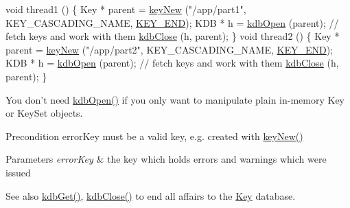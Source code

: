 \begin{DoxyCodeInclude}
\textcolor{keywordtype}{void} thread1 ()
\{
        Key * parent = \hyperlink{group__key_gad23c65b44bf48d773759e1f9a4d43b89}{keyNew} (\textcolor{stringliteral}{"/app/part1"}, KEY\_CASCADING\_NAME, \hyperlink{group__key_gga91fb3178848bd682000958089abbaf40aa8adb6fcb92dec58fb19410eacfdd403}{KEY\_END});
        KDB * h = \hyperlink{group__kdb_ga6808defe5870f328dd17910aacbdc6ca}{kdbOpen} (parent);
        \textcolor{comment}{// fetch keys and work with them}
        \hyperlink{group__kdb_gadb54dc9fda17ee07deb9444df745c96f}{kdbClose} (h, parent);
\}
\textcolor{keywordtype}{void} thread2 ()
\{
        Key * parent = \hyperlink{group__key_gad23c65b44bf48d773759e1f9a4d43b89}{keyNew} (\textcolor{stringliteral}{"/app/part2"}, KEY\_CASCADING\_NAME, \hyperlink{group__key_gga91fb3178848bd682000958089abbaf40aa8adb6fcb92dec58fb19410eacfdd403}{KEY\_END});
        KDB * h = \hyperlink{group__kdb_ga6808defe5870f328dd17910aacbdc6ca}{kdbOpen} (parent);
        \textcolor{comment}{// fetch keys and work with them}
        \hyperlink{group__kdb_gadb54dc9fda17ee07deb9444df745c96f}{kdbClose} (h, parent);
\}
\end{DoxyCodeInclude}
 You don't need \hyperlink{group__kdb_ga6808defe5870f328dd17910aacbdc6ca}{kdb\+Open()} if you only want to manipulate plain in-\/memory Key or Key\+Set objects.

\begin{DoxyPrecond}{Precondition}
error\+Key must be a valid key, e.\+g. created with \hyperlink{group__key_gad23c65b44bf48d773759e1f9a4d43b89}{key\+New()}
\end{DoxyPrecond}

\begin{DoxyParams}{Parameters}
{\em error\+Key} & the key which holds errors and warnings which were issued \\
\hline
\end{DoxyParams}
\begin{DoxySeeAlso}{See also}
\hyperlink{group__kdb_ga28e385fd9cb7ccfe0b2f1ed2f62453a1}{kdb\+Get()}, \hyperlink{group__kdb_gadb54dc9fda17ee07deb9444df745c96f}{kdb\+Close()} to end all affairs to the \hyperlink{group__key}{Key} database. 
\end{DoxySeeAlso}

